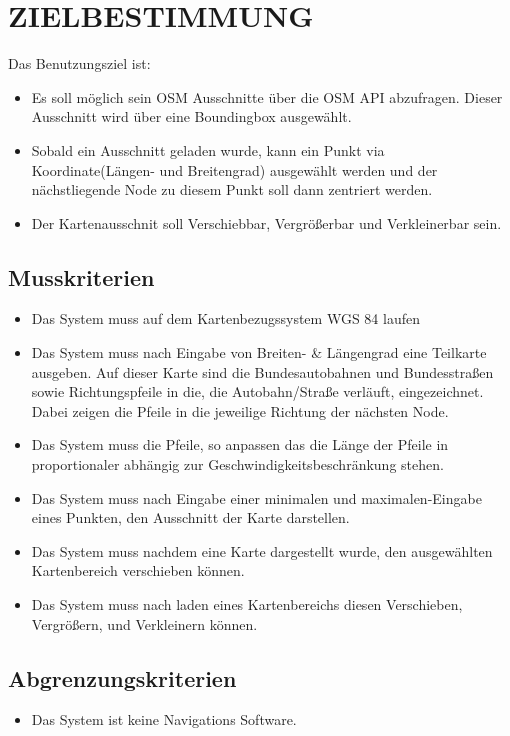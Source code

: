 \newpage
	\section{\Large ZIELBESTIMMUNG}
	Das Benutzungsziel ist:
	\begin{itemize}
		\item Es soll möglich sein OSM Ausschnitte über die OSM API abzufragen. Dieser Ausschnitt wird über eine Boundingbox ausgewählt.
		\item Sobald ein Ausschnitt geladen wurde, kann ein Punkt via Koordinate(Längen- und Breitengrad) ausgewählt werden und der nächstliegende Node zu diesem Punkt soll dann zentriert werden.
		\item Der Kartenausschnit soll Verschiebbar, Vergrößerbar und Verkleinerbar sein.
	\end{itemize}
	\subsection{Musskriterien}
	\begin{itemize}
		\item Das System muss auf dem Kartenbezugssystem WGS 84 laufen
		\item Das System muss nach Eingabe von Breiten- \& Längengrad eine Teilkarte ausgeben. Auf dieser Karte sind die Bundesautobahnen und Bundesstraßen sowie Richtungspfeile in die, die Autobahn/Straße verläuft, eingezeichnet. Dabei zeigen die Pfeile in die jeweilige Richtung der nächsten Node.
		\item Das System muss die Pfeile, so anpassen das die Länge der Pfeile in proportionaler abhängig zur Geschwindigkeitsbeschränkung stehen. 
		\item Das System muss nach Eingabe einer minimalen und maximalen-Eingabe eines Punkten, den Ausschnitt der Karte darstellen.
		\item Das System muss nachdem eine Karte dargestellt wurde, den ausgewählten Kartenbereich verschieben können.
		\item Das System muss nach laden eines Kartenbereichs diesen Verschieben, Vergrößern, und Verkleinern können.
	\end{itemize}
	\subsection{Abgrenzungskriterien}
	\begin{itemize}
		\item Das System ist keine Navigations Software.
	\end{itemize}
	
